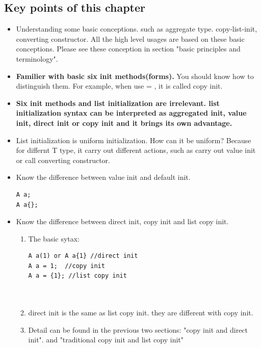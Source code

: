 \documentclass[a4paper,11pt,twoside]{book}
\begin{document}
\subsection{Key points of this chapter}
\begin{itemize}
	
	\item Understanding some basic conceptions. such as aggregate type. copy-list-init, converting constructor. All the high level usages are based on these basic conceptions. Please see these conception in section "basic principles and terminology".
		  
				
	
	\item \textbf{Familier with basic six init methods(forms).} You should know how to distinguish them. For example, when use = , it is called copy init. 
	
	\item \textbf{Six init methods and list initialization are irrelevant. list initialization syntax can be interpreted as aggregated init, value init, direct init or copy init and it brings its own advantage.} 
	
	\item List initialization is uniform initialization. How can it be uniform? Because for differnt T type, it carry out different actions, such as carry out value init or call converting constructor.

	\item Know the difference between value init and default init. 
\begin{lstlisting}
A a;
A a{};
\end{lstlisting}	 

	\item Know the difference between direct init, copy init and list copy init. 
	\begin{enumerate}
		\item The basic sytax:
\begin{lstlisting}
A a(1) or A a{1} //direct init
A a = 1;  //copy init
A a = {1}; //list copy init	
		  
			
\end{lstlisting}	 
		\item direct init is the same as list copy init. they are different with copy init.
		\item Detail can be found in the previous two sections: "copy init and direct init". and "traditional copy init and list copy init"
		
	\end{enumerate}
  

\end{itemize}
\end{document}
